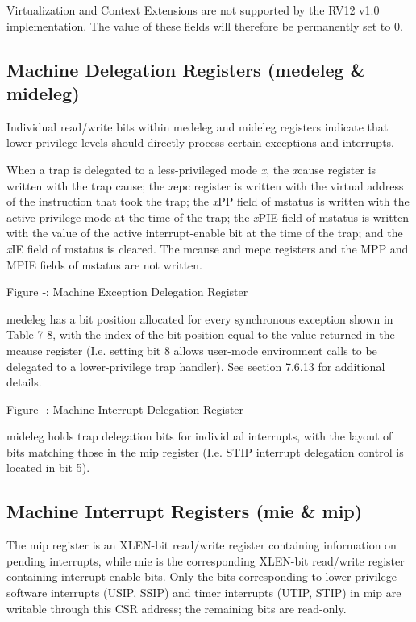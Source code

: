Virtualization and Context Extensions are not supported by the RV12 v1.0
implementation. The value of these fields will therefore be permanently
set to 0.

\subsection{Machine Delegation Registers
(medeleg \& mideleg)} \label{machine-exception-interrupt-delegation-registers-medeleg-mideleg}

Individual read/write bits within medeleg and mideleg registers indicate
that lower privilege levels should directly process certain exceptions
and interrupts.

When a trap is delegated to a less-privileged mode \emph{x}, the
\emph{x}cause register is written with the trap cause; the \emph{x}epc
register is written with the virtual address of the instruction that
took the trap; the \emph{x}PP field of mstatus is written with the
active privilege mode at the time of the trap; the \emph{x}PIE field of
mstatus is written with the value of the active interrupt-enable bit at
the time of the trap; and the \emph{x}IE field of mstatus is cleared.
The mcause and mepc registers and the MPP and MPIE fields of mstatus are
not written.

\missingfigure{}

Figure ‑: Machine Exception
Delegation Register

medeleg has a bit position allocated for every synchronous exception
shown in Table 7‑8, with the index of the bit position equal to the
value returned in the mcause register (I.e. setting bit 8 allows
user-mode environment calls to be delegated to a lower-privilege trap
handler). See section 7.6.13 for additional details.

\missingfigure{}

\protect\hypertarget{_Ref367088721}{}{}Figure ‑: Machine Interrupt
Delegation Register

mideleg holds trap delegation bits for individual interrupts, with the
layout of bits matching those in the mip register (I.e. STIP interrupt
delegation control is located in bit 5).

\subsection{Machine Interrupt Registers (mie \&
mip)}\label{machine-interrupt-registers-mie-mip}

The mip register is an XLEN-bit read/write register containing
information on pending interrupts, while mie is the corresponding
XLEN-bit read/write register containing interrupt enable bits. Only the
bits corresponding to lower-privilege software interrupts (USIP, SSIP)
and timer interrupts (UTIP, STIP) in mip are writable through this CSR
address; the remaining bits are read-only.

